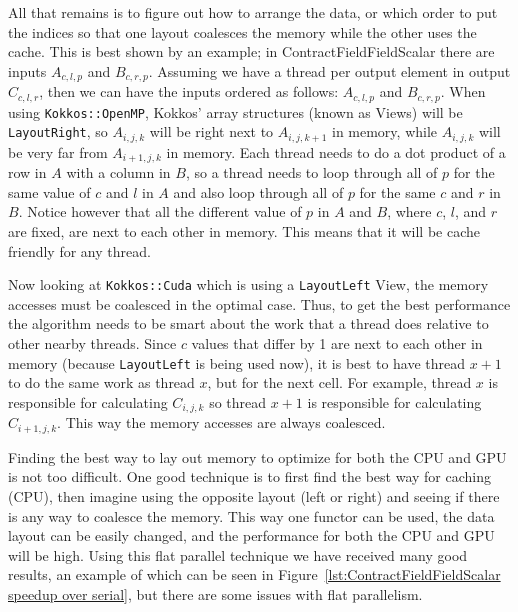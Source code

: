 All that remains is to
figure out how to arrange the data, or which order to put the indices so that
one layout coalesces the memory while the other uses the cache. This is best
shown by an example; in ContractFieldFieldScalar there are inputs $A_{c, l, p}$
and $B_{c, r, p}$. Assuming we have a thread per output element in output
$C_{c, l, r}$, then we can have the inputs ordered as follows: $A_{c, l, p}$
and $B_{c, r, p}$. When using \texttt{Kokkos::OpenMP}, Kokkos' array structures (known as Views) will be \texttt{LayoutRight}, so
$A_{i, j, k}$ will be right next to $A_{i, j, k+1}$ in memory, while $A_{i, j,
k}$ will be very far from $A_{i+1, j, k}$ in memory. Each thread needs to do a
dot product of a row in $A$ with a column in $B$, so a thread needs to loop
through all of $p$ for the same value of $c$ and $l$ in $A$ and also loop
through all of $p$ for the same $c$ and $r$ in $B$. Notice however that all the
different value of $p$ in $A$ and $B$, where $c$, $l$, and $r$ are fixed, are
next to each other in memory. This means that it will be cache friendly for any
thread. 

Now looking at \texttt{Kokkos::Cuda} which is using a \texttt{LayoutLeft} View, the memory accesses must
be coalesced in the optimal case. Thus, to get the best performance the algorithm
needs to be smart about the work that a thread does relative to other nearby
threads. Since $c$ values that differ by 1 are next to each other in memory
(because \texttt{LayoutLeft} is being used now), it is best to have thread $x+1$ to do
the same work as thread $x$, but for the next cell. For example, thread $x$ is
responsible for calculating $C_{i, j, k}$ so thread $x+1$ is responsible for
calculating $C_{i+1, j, k}$. This way the memory accesses are always coalesced. 

Finding the best way to lay out memory to optimize for both the CPU and GPU is
not too difficult. One good technique is to first find the best way for caching (CPU),
then imagine using the opposite layout (left or right) and seeing if there is
any way to coalesce the memory. This way one functor can be used, the data
layout can be easily changed, and the performance for both the CPU and GPU will
be high. Using this flat parallel technique we have received many good results,
an example of which can be seen in Figure~\ref{lst:ContractFieldFieldScalar
speedup over serial}, but there are some issues with flat parallelism.

